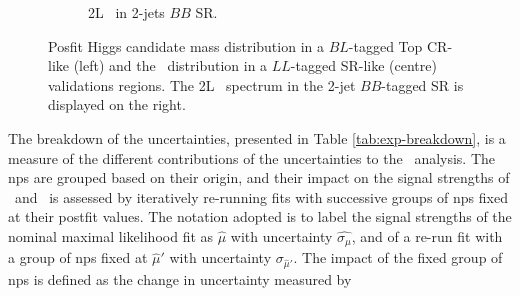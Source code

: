 \begin{figure}[h!]
\begin{subfigure}[b]{0.32\textwidth}
      \caption{2L \ptv\ in 2-jets $BB$ SR.}
      \label{fig:fit_ptv2L}
    \end{subfigure} 
    \caption{Posfit Higgs candidate mass distribution in a $BL$-tagged Top CR-like (left) and the \ptv\ distribution in a $LL$-tagged SR-like (centre) validations regions. The 2L \ptv\ spectrum in the 2-jet $BB$-tagged SR is displayed on the right.}
    \label{fig:postfitval}
\end{figure} 

The breakdown of the uncertainties, presented in Table \ref{tab:exp-breakdown}, is a measure of the different contributions of the uncertainties to the \vhbc\ analysis. The \glspl{np} are grouped based on their origin, and their impact on the signal strengths of \vhb\ and \vhc\ is assessed by iteratively re-running fits with successive groups of \glspl{np} fixed at their postfit values. The notation adopted is to label the signal strengths of the nominal maximal likelihood fit as $\hat{\mu}$ with uncertainty $\hat{\sigma_{\mu}}$, and of a re-run fit with a group of \glspl{np} fixed at $\hat{\mu}'$ with uncertainty $\sigma_{\hat{\mu}'}$. The impact of the fixed group of \glspl{np} is defined as the change in uncertainty measured by 

